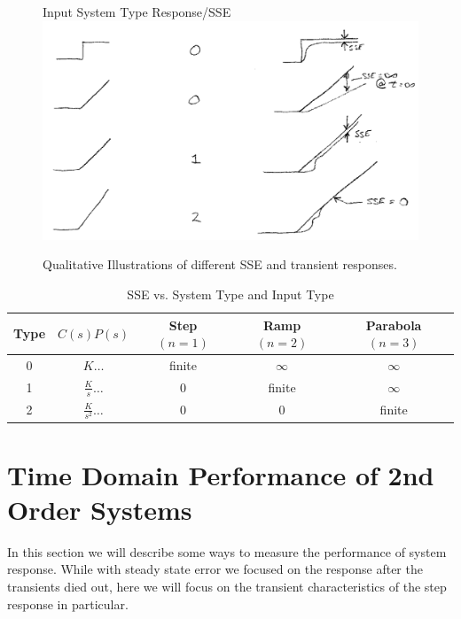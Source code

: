 \begin{figure}\centering
Input \hspace{0.75in}  System Type \hspace{0.5in} Response/SSE\\[0.1in]
\includegraphics[width=4.50in]{figs11/00476a.png}\caption{Qualitative Illustrations of different SSE and transient responses.}\label{SSEtransients}
\end{figure}




\begin{table}\centering
\begin{tabular}{|c|c|c|c|c|} \hline
Type	&	$C(s)P(s)$	&	Step $(n=1)$	&	Ramp $(n=2)$	& 	Parabola $(n=3)$   \\ \hline
0	&	$K\dots$	&	finite		&	$\infty$	&	$\infty$	   \\ \hline
1	&	$\frac{K}{s}\dots$&	0		&	finite		&	$\infty$	   \\ \hline
2	&	$\frac{K}{s^2}\dots$&0		&       0        	&	finite		   \\ \hline
\end{tabular}

\caption{SSE vs. System Type and Input Type}\label{SystemTypeError}
\end{table}




\section{Time Domain Performance of 2nd Order Systems}

In this section we will describe some ways to measure the performance of system response.  While with steady state error we focused on the response after the transients died out, here we will focus on the transient characteristics of the step response in particular.

